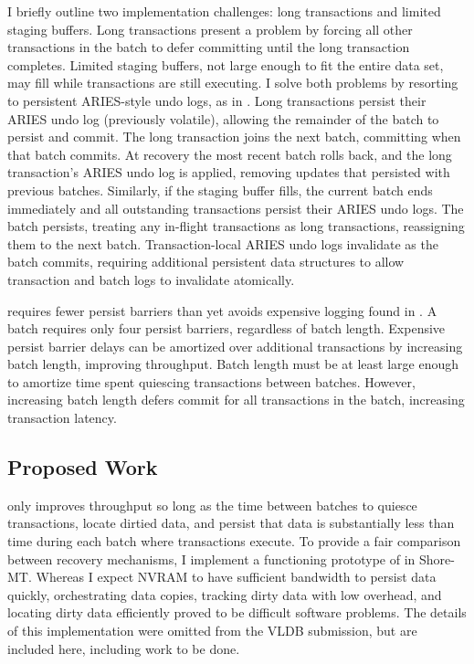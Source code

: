 I briefly outline two implementation challenges: long transactions and limited staging buffers.
Long transactions present a problem by forcing all other transactions in the batch to defer committing until the long transaction completes.
Limited staging buffers, not large enough to fit the entire data set, may fill while transactions are still executing.
I solve both problems by resorting to persistent ARIES-style undo logs, as in \InPlace.
Long transactions persist their ARIES undo log (previously volatile), allowing the remainder of the batch to persist and commit.
The long transaction joins the next batch, committing when that batch commits.
At recovery the most recent batch rolls back, and the long transaction's ARIES undo log is applied, removing updates that persisted with previous batches.
Similarly, if the staging buffer fills, the current batch ends immediately and all outstanding transactions persist their ARIES undo logs.
The batch persists, treating any in-flight transactions as long transactions, reassigning them to the next batch.
Transaction-local ARIES undo logs invalidate as the batch commits, requiring additional persistent data structures to allow transaction and batch logs to invalidate atomically.

\GroupCommit requires fewer persist barriers than \InPlace yet avoids expensive logging found in \NVDisk.
A batch requires only four persist barriers, regardless of batch length.
Expensive persist barrier delays can be amortized over additional transactions by increasing batch length, improving throughput.
Batch length must be at least large enough to amortize time spent quiescing transactions between batches.
However, increasing batch length defers commit for all transactions in the batch, increasing transaction latency.

\subsection{Proposed Work}
\label{sec::OLTP_design:GroupCommit:Proposed}

\GroupCommit only improves throughput so long as the time between batches to quiesce transactions, locate dirtied data, and persist that data is substantially less than time during each batch where transactions execute.
To provide a fair comparison between recovery mechanisms, I implement a functioning prototype of \GroupCommit in Shore-MT.
Whereas I expect NVRAM to have sufficient bandwidth to persist data quickly, orchestrating data copies, tracking dirty data with low overhead, and locating dirty data efficiently proved to be difficult software problems.
The details of this implementation were omitted from the VLDB submission, but are included here, including work to be done.


